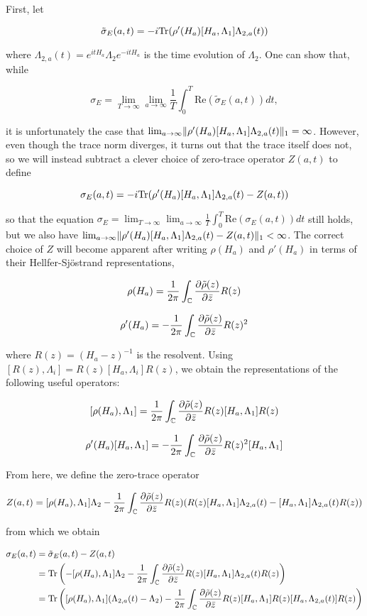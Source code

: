 \documentclass[12pt, letterpaper]{article}
\begin{document}
First, let 

\[\tilde{\sigma}_E(a,t) = -i\text{Tr}(\rho'(H_a)[H_a,\Lambda_1]\Lambda_{2,a}(t))\]

where $\Lambda_{2,a}(t) = e^{itH_a}\Lambda_2 e^{-itH_a}$ is the time evolution of $\Lambda_2$. One can show that, while 

\[\sigma_E = \lim_{T\to\infty}\lim_{a\to\infty} \frac{1}{T}\int_0^T \text{Re}(\tilde{\sigma}_E(a,t))dt,\]

it is unfortunately the case that $\lim_{a\to\infty}\lVert \rho'(H_a)[H_a,\Lambda_1]\Lambda_{2,a}(t) \rVert_1 = \infty$. However, even though the trace norm diverges, it turns out that the trace itself does not, so we will instead subtract a clever choice of zero-trace operator $Z(a,t)$ to define

\[\sigma_E(a,t) = -i\text{Tr}(\rho'(H_a)[H_a,\Lambda_1]\Lambda_{2,a}(t)-Z(a,t))\]

so that the equation $\sigma_E = \lim_{T\to\infty}\lim_{a\to\infty} \frac{1}{T}\int_0^T \text{Re}(\sigma_E(a,t))dt$ still holds, but we also have $\lim_{a\to\infty}\lVert \rho'(H_a)[H_a,\Lambda_1]\Lambda_{2,a}(t) - Z(a,t) \rVert_1 < \infty$. The correct choice of $Z$ will become apparent after writing $\rho(H_a)$ and $\rho'(H_a)$ in terms of their Hellfer-Sj\"{o}strand representations,

\[\rho(H_a) = \frac{1}{2\pi} \int_{\mathbb{C}} \frac{\partial \tilde{\rho}(z)}{\partial \bar{z}} R(z)\]

\[\rho'(H_a) = -\frac{1}{2\pi}\int_{\mathbb{C}} \frac{\partial \tilde{\rho}(z)}{\partial \bar{z}} R(z)^2\]

where $R(z) = (H_a - z)^{-1}$ is the resolvent. Using $[R(z),\Lambda_i] = R(z)[H_a,\Lambda_i]R(z)$, we obtain the representations of the following useful operators:

\[[\rho(H_a),\Lambda_1] = \frac{1}{2\pi} \int_{\mathbb{C}} \frac{\partial \tilde{\rho}(z)}{\partial \bar{z}} R(z)[H_a,\Lambda_1]R(z)\]

\[\rho'(H_a)[H_a,\Lambda_1] = -\frac{1}{2\pi} \int_{\mathbb{C}} \frac{\partial \tilde{\rho}(z)}{\partial \bar{z}} R(z)^2[H_a,\Lambda_1]\]

From here, we define the zero-trace operator

\[Z(a,t) = [\rho(H_a),\Lambda_1]\Lambda_2 - \frac{1}{2\pi} \int_{\mathbb{C}} \frac{\partial \tilde{\rho}(z)}{\partial \bar{z}} R(z)(R(z)[H_a,\Lambda_1]\Lambda_{2,a}(t) - [H_a,\Lambda_1]\Lambda_{2,a}(t)R(z))\]

from which we obtain

\[\begin{aligned}
\sigma_E(a,t) &= \tilde{\sigma}_E(a,t) - Z(a,t)\\
&= \text{Tr}\left(-[\rho(H_a),\Lambda_1]\Lambda_2 - \frac{1}{2\pi}\int_{\mathbb{C}} \frac{\partial \tilde{\rho}(z)}{\partial \bar{z}}R(z)[H_a,\Lambda_1]\Lambda_{2,a}(t)R(z)\right)\\
&= \text{Tr}\left([\rho(H_a),\Lambda_1](\Lambda_{2,a}(t)-\Lambda_2) - \frac{1}{2\pi}\int_{\mathbb{C}}\frac{\partial \tilde{\rho}(z)}{\partial \bar{z}}R(z)[H_a,\Lambda_1]R(z)[H_a,\Lambda_{2,a}(t)]R(z)\right)
\end{aligned}\]
\end{document}
